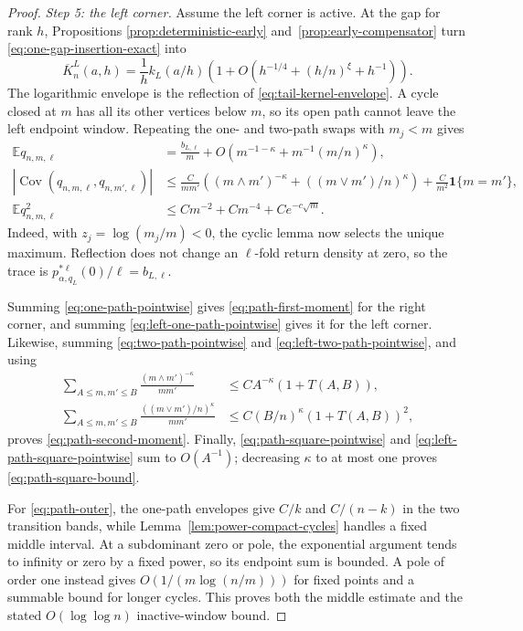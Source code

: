 \documentclass[11pt]{article}
\theoremstyle{remark}
\theoremstyle{plain}
\newcommand{\E}{\mathbb E}
\newcommand{\one}{\mathbf 1}
\begin{document}
\begin{proof}
\smallskip
\noindent\emph{Step 5: the left corner.}
Assume the left corner is active.  At the gap for rank $h$, Propositions
\ref{prop:deterministic-early} and~\ref{prop:early-compensator} turn
\eqref{eq:one-gap-insertion-exact} into
\begin{equation}\label{eq:discrete-left-kernel}
 \overline K_n^L(a,h)=\frac1h k_L(a/h)
 \left(1+O(h^{-1/4}+(h/n)^\xi+h^{-1})\right).
\end{equation}
The logarithmic envelope is the reflection of
\eqref{eq:tail-kernel-envelope}.  A cycle closed at $m$ has all its other
vertices below $m$, so its open path cannot leave the left endpoint window.
Repeating the one- and two-path swaps with $m_j<m$ gives
\begin{align}
 \E q_{n,m,\ell}
 &=\frac{b_{L,\ell}}m
 +O\left(m^{-1-\kappa}+m^{-1}(m/n)^\kappa\right),
 \label{eq:left-one-path-pointwise}\\
 \left|\operatorname{Cov}(q_{n,m,\ell},q_{n,m',\ell})\right|
 &\le \frac{C}{mm'}\left((m\wedge m')^{-\kappa}
 +((m\vee m')/n)^\kappa\right)
 +\frac C{m^2}\one\{m=m'\},
 \label{eq:left-two-path-pointwise}\\
 \E q_{n,m,\ell}^2
 &\le Cm^{-2}+Cm^{-4}+Ce^{-c\sqrt m}.
 \label{eq:left-path-square-pointwise}
\end{align}
Indeed, with $z_j=\log(m_j/m)<0$, the cyclic lemma now selects the unique
maximum.  Reflection does not change an $\ell$-fold return density at zero,
so the trace is $p_{\alpha,q_L}^{*\ell}(0)/\ell=b_{L,\ell}$.

Summing \eqref{eq:one-path-pointwise} gives
\eqref{eq:path-first-moment} for the right corner, and summing
\eqref{eq:left-one-path-pointwise} gives it for the left corner.  Likewise,
summing \eqref{eq:two-path-pointwise} and
\eqref{eq:left-two-path-pointwise}, and using
\[
\begin{aligned}
 \sum_{A\le m,m'\le B}\frac{(m\wedge m')^{-\kappa}}{mm'}
 &\le CA^{-\kappa}(1+T(A,B)),\\
 \sum_{A\le m,m'\le B}
 \frac{((m\vee m')/n)^\kappa}{mm'}
 &\le C(B/n)^\kappa(1+T(A,B))^2,
\end{aligned}
\]
proves \eqref{eq:path-second-moment}.  Finally,
\eqref{eq:path-square-pointwise} and
\eqref{eq:left-path-square-pointwise} sum to $O(A^{-1})$; decreasing
$\kappa$ to at most one proves \eqref{eq:path-square-bound}.

For \eqref{eq:path-outer}, the one-path envelopes give $C/k$ and
$C/(n-k)$ in the two transition bands, while
Lemma~\ref{lem:power-compact-cycles} handles a fixed middle interval.
At a subdominant zero or pole, the exponential argument tends to infinity
or zero by a fixed power, so its endpoint sum is bounded.  A pole of order
one instead gives $O(1/(m\log(n/m)))$ for fixed points and a summable bound
for longer cycles.  This proves both the middle estimate and the stated
$O(\log\log n)$ inactive-window bound.
\end{proof}
\end{document}
